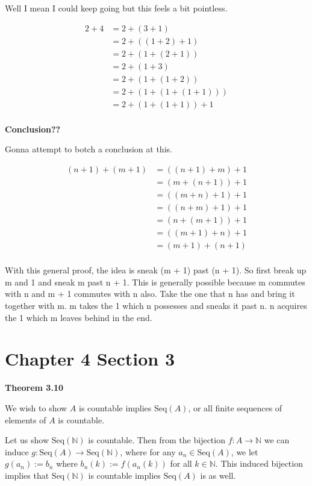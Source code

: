 \documentclass{article}
\begin{document}
\begin{enumerate}
Well I mean I could keep going but this feels a bit pointless.

\medskip
\begin{align*}
	2 + 4 &= 2 + (3 + 1)\\
	&= 2 + ((1 + 2) + 1)\\
	&= 2 + (1 + (2 + 1))\\
	&= 2 + (1 + 3)\\
	&= 2 + (1 + (1 + 2))\\
	&= 2 + (1 + (1 + (1 + 1)))\\
	&= 2 + (1 + (1 + 1)) + 1\\
\end{align*}

\newpage
\textbf{Conclusion??}

Gonna attempt to botch a conclusion at this. 

\begin{align}
	(n + 1) + (m + 1) &= ((n + 1) + m) + 1\\
	&= (m + (n + 1)) + 1\\
	&= ((m + n) + 1) + 1\\
	&= ((n + m) + 1) + 1\\
	&= (n + (m + 1)) + 1\\
	&= ((m + 1) + n) + 1\\
	&= (m + 1) + (n + 1)\\
\end{align}

With this general proof, the idea is sneak (m + 1) past (n + 1). So first break up m and 1 and sneak m past n + 1. This is generally possible because m commutes with n and m + 1 commutes with n also. Take the one that n has and bring it together with m. m takes the 1 which n possesses and sneaks it past n. n acquires the 1 which m leaves behind in the end. 
\end{enumerate}

\section{Chapter 4 Section 3}

\medskip
\textbf{Theorem 3.10}
\medskip

We wish to show $A$ is countable implies $\text{Seq}(A)$, or all finite sequences of elements of $A$ is countable.

Let us show $\text{Seq}(\mathbb{N})$ is countable. Then from the bijection $f: A \xrightarrow{} \mathbb{N}$ we can induce $g: \text{Seq}(A) \xrightarrow{} \text{Seq}(\mathbb{N})$, where for any $a_n \in \text{Seq}(A)$, we let $g(a_n) := b_n$ where $b_n(k) := f(a_n(k))$ for all $k \in \mathbb{N}$. This induced bijection implies that $\text{Seq}(\mathbb{N})$ is countable implies $\text{Seq}(A)$ is as well.
\end{document}
